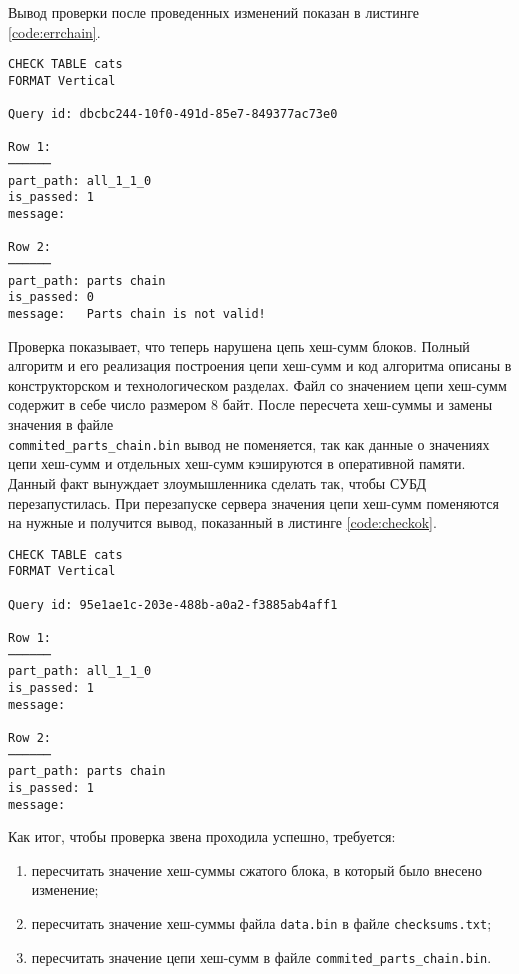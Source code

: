Вывод проверки после проведенных изменений показан в листинге \ref{code:errchain}.

\begin{lstlisting}[label=code:errchain, caption={Результат проверки после исправления \texttt{checksums.txt}}]
CHECK TABLE cats
FORMAT Vertical

Query id: dbcbc244-10f0-491d-85e7-849377ac73e0

Row 1:
──────
part_path: all_1_1_0
is_passed: 1
message:

Row 2:
──────
part_path: parts chain
is_passed: 0
message:   Parts chain is not valid!
\end{lstlisting}

Проверка показывает, что теперь нарушена цепь хеш-сумм блоков. Полный алгоритм и его реализация построения цепи хеш-сумм и код алгоритма описаны в конструкторском и технологическом разделах. Файл со значением цепи хеш-сумм содержит в себе число размером 8 байт. После пересчета хеш-суммы и замены значения в файле \\ \texttt{commited\_parts\_chain.bin} вывод не поменяется, так как данные о значениях цепи хеш-сумм и отдельных хеш-сумм кэшируются в оперативной памяти. Данный факт вынуждает злоумышленника сделать так, чтобы СУБД перезапустилась. При перезапуске сервера значения цепи хеш-сумм поменяются на нужные и получится вывод, показанный в листинге \ref{code:checkok}.

\pagebreak

\begin{lstlisting}[label=code:checkok, caption={Результат проверки после исправления \texttt{commited\_parts\_chain.bin}.}]
CHECK TABLE cats
FORMAT Vertical

Query id: 95e1ae1c-203e-488b-a0a2-f3885ab4aff1

Row 1:
──────
part_path: all_1_1_0
is_passed: 1
message:

Row 2:
──────
part_path: parts chain
is_passed: 1
message:
\end{lstlisting}

Как итог, чтобы проверка звена проходила успешно, требуется:
\begin{enumerate}
    \item пересчитать значение хеш-суммы сжатого блока, в который было внесено изменение;
    \item пересчитать значение хеш-суммы файла \texttt{data.bin} в файле \texttt{checksums.txt};
    \item пересчитать значение цепи хеш-сумм в файле \texttt{commited\_parts\_chain.bin}.
\end{enumerate}

